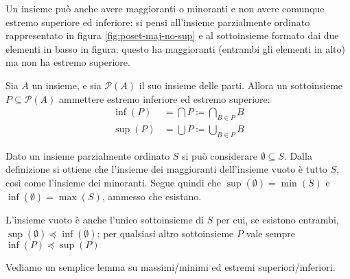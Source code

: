 \documentclass[12pt]{article}
\numberwithin{theorem}{subsection}
\begin{document}
Un insieme può anche avere maggioranti o minoranti e non avere comunque estremo superiore ed inferiore: si pensi all'insieme parzialmente ordinato rappresentato in figura \ref{fig:poset-maj-no-sup} e al sottoinsieme formato dai due elementi in basso in figura: questo ha maggioranti (entrambi gli elementi in alto) ma non ha estremo superiore.

\begin{figure*}
	\centering
	\caption{Poset con maggioranti ma senza $\sup$}
	\label{fig:poset-maj-no-sup}
\end{figure*}

\begin{example}
	Sia $A$ un insieme, e sia $\mathcal{P}(A)$ il suo insieme delle parti. Allora un sottoinsieme $P \subseteq \mathcal{P}(A)$ ammettere estremo inferiore ed estremo superiore:
	\begin{align*}
	\inf(P) &= \bigcap P \coloneqq \bigcap\limits_{B \in P} B\\
	\sup(P) &= \bigcup P \coloneqq \bigcup\limits_{B \in P} B
	\end{align*}
\end{example}

\begin{example}
	Dato un insieme parzialmente ordinato $S$ si può considerare $\emptyset \subseteq S$. Dalla definizione si ottiene che l'insieme dei maggioranti dell'insieme vuoto è tutto $S$, così come l'insieme dei minoranti. Segue quindi che $\sup(\emptyset) = \min(S)$ e $\inf(\emptyset) = \max(S)$, ammesso che esistano.
	
	L'insieme vuoto è anche l'unico sottoinsieme di $S$ per cui, se esistono entrambi, $\sup(\emptyset) \preceq \inf(\emptyset)$; per qualsiasi altro sottoinsieme $P$ vale sempre $\inf(P) \preceq  \sup(P)$
\end{example}

Vediamo un semplice lemma su massimi/minimi ed estremi superiori/inferiori.
\end{document}
